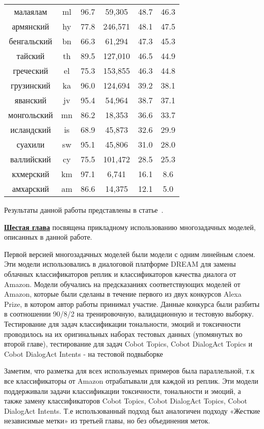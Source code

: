 \begin{table*}
{\begin{tabular}{|c|c|c||c|c|c|}
малаялам & ml & 96.7 & 59,305 & 48.7 & 46.3\\
армянский & hy & 77.8 & 246,571 & 48.1 & 47.5\\
бенгальский & bn & 66.3 & 61,294 & 47.3 & 45.3\\
тайский & th & 89.5 & 127,010 & 46.5 & 44.9\\
греческий & el & 75.3 & 153,855 & 46.3 & 44.8\\
грузинский & ka & 96.0 & 124,694 & 39.2 & 38.1\\
яванский & jv & 95.4 & 54,964 & 38.7 & 37.1\\
монгольский & mn & 86.2 & 18,353 & 36.6 & 33.7\\
исландский & is & 68.9 & 45,873 & 32.6 & 29.9\\
суахили & sw & 95.1 & 45,806 & 31.0 & 28.0\\
валлийский & cy & 75.5 & 101,472 & 28.5 & 25.3\\
кхмерский & km & 97.1 & 6,741 & 16.1 & 8.6\\
амхарский & am & 86.6 & 14,375 & 12.1 & 5.0\\
\end{tabular}
}
\end{table*}

Результаты данной работы представлены в статье~\cite{rutopics}.

\underline{\textbf{Шестая глава}} посвящена прикладному использованию многозадачных моделей, описанных в данной работе.

Первой версией многозадачных моделей были модели с одним линейным слоем. Эти модели использовались в диалоговой платформе DREAM для замены облачных классификаторов реплик и классификаторов качества диалога от Amazon. Модели обучались на предсказаниях соответствующих моделей от Amazon, которые были сделаны в течение первого из двух конкурсов Alexa Prize, в котором автор работы принимал участие. Данные конкурса были разбиты в соотношении 90/8/2 на тренировочную, валидационную и тестовую выборку. Тестирование для задач классификации тональности, эмоций и токсичности проводилось на их оригинальных наборах тестовых данных (упомянутых во второй главе), тестирование для задач Cobot Topics, Cobot DialogAct Topics и Cobot DialogAct Intents - на тестовой подвыборке

Заметим, что разметка для всех используемых примеров была параллельной, т.к все классификаторы от Amazon отрабатывали для каждой из реплик. Эти модели поддерживали задачи классификации токсичности, тональности и эмоций, а также замену классификаторов Cobot Topics, Cobot DialogAct Topics, Cobot DialogAct Intents. Т.е использованный подход был аналогичен подходу «Жесткие независимые метки» из третьей главы, но без объединения меток. 

